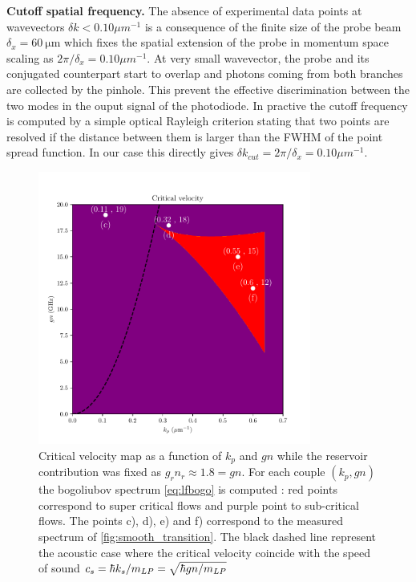 \bigskip

\textbf{Cutoff spatial frequency.} The absence of experimental data points at wavevectors $\delta k < 0.10 \mu m^{-1}$ is a consequence of the finite size 
of the probe beam $\delta_x = \SI{60}{\micro\meter}$ which fixes the spatial extension of the probe in momentum space
 scaling as $2\pi/\delta_x=0.10 \mu m^{-1}$. At very small wavevector, the probe and its conjugated counterpart start to overlap and photons
 coming from both branches are collected by the pinhole. This prevent the effective discrimination between the two modes in the ouput signal of the photodiode. In practive the 
 cutoff frequency is computed by a simple optical Rayleigh criterion stating that two points are resolved if the distance between them is larger than the FWHM of the point spread function.
In our case this directly gives $\delta k_{cut} = 2\pi/\delta_x= 0.10 \mu m^{-1}$.

\begin{figure}
    \centering
    \includegraphics[width=0.8\textwidth]{chap3_custom_st/fig/critical_velocity_map.pdf}
    \caption{Critical velocity map as a function of $k_p$ and $gn$ while the reservoir contribution was fixed as $g_rn_r\approx 1.8=gn$. For each couple $(k_p,gn)$ the bogoliubov spectrum \autoref{eq:lfbogo} is computed : red points correspond to super critical flows and purple point to sub-critical flows.
    The points c), d), e) and f) correspond to the measured spectrum of \autoref{fig:smooth_transition}. The black dashed line represent the acoustic case where the critical velocity coincide with the speed of sound $c_s = \hbar k_s/m_{LP}=\sqrt{\hbar gn/m_{LP}}$ }
    \label{fig:critical_velocity_map}
\end{figure}

